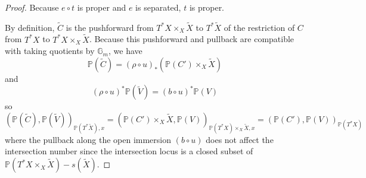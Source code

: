\documentclass[12pt]{amsart}
\theoremstyle{definition}
\theoremstyle{remark}
\newcommand{\inhyper}[1] {\tilde{#1}}
\begin{document}
\begin{proof}
Because $e\circ t$ is proper and $e$ is separated, $t$ is proper. 
 
By definition, $\tilde{C}$ is the pushforward from $T^* X \times_X \tilde{X}$ to $T^* \tilde{X}$ of the restriction of $C$ from $T^* X$ to $T^* X \times_X \tilde{X}$. Because this pushforward and pullback are compatible with taking quotients by $\mathbb G_m$, we have \[  \mathbb P( \inhyper{C})  = (\rho \circ u) _*  ( \mathbb P(C') \times_X \inhyper{X}) \] and \[(\rho\circ u)^* \mathbb P(\inhyper{V}) =(b \circ u)^*  \mathbb P(V)\]
so \cite[Proposition 8.1.1(c)]{Fulton} \[ ( \mathbb P( \inhyper{C}), \mathbb P(\inhyper{V}))_{\mathbb P(T^* \inhyper{X}), x}   
=  (  \mathbb P(C') \times_X \inhyper{X}  , \mathbb P(V))_{\mathbb P(T^* X)\times_{X} \inhyper{X},x }  = (\mathbb P(C'), \mathbb P(V))_{\mathbb P(T^* X)} \] where the pullback along the open immersion $(b\circ u)$ does not affect the intersection number since the intersection locus is a closed subset of $  \mathbb P(T^*X \times_X \inhyper{X}  ) - s(\inhyper{X})$. 




%
%
%
%
%



\end{proof}
\end{document}
